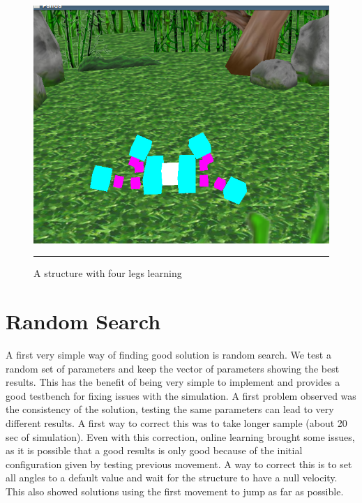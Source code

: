  
\begin{figure}[htbp]
    \centering
    \includegraphics[scale=0.5]{Figures/four_legged.png}
    \rule{35em}{0.5pt}
    \caption[A structure with four legs learning]{A structure with four legs learning}
    \label{fig:four_legged}
\end{figure}

\section{Random Search}

A first very simple way of finding good solution is random search. We test a random set of parameters and keep the vector of parameters showing the best results. This has the benefit of being very simple to implement and provides a good testbench for fixing issues with the simulation. A first problem observed was the consistency of the solution, testing the same parameters can lead to very different results. A first way to correct this was to take longer sample (about 20 sec of simulation). Even with this correction, online learning brought some issues, as it is possible that a good results is only good because of the initial configuration given by testing previous movement. A way to correct this is to set all angles to a default value and wait for the structure to have a null velocity. This also showed solutions using the first movement to jump as far as possible. 




